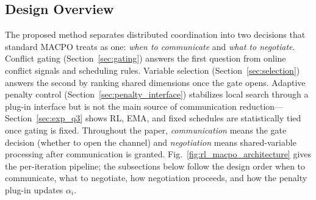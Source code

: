 \documentclass[conference]{IEEEtran}
\begin{document}
\subsection{Design Overview}\label{sec:design_overview}
The proposed method separates distributed coordination into two decisions that standard MACPO treats as one: \emph{when to communicate} and \emph{what to negotiate}. Conflict gating (Section~\ref{sec:gating}) answers the first question from online conflict signals and scheduling rules. Variable selection (Section~\ref{sec:selection}) answers the second by ranking shared dimensions once the gate opens. Adaptive penalty control (Section~\ref{sec:penalty_interface}) stabilizes local search through a plug-in interface but is not the main source of communication reduction---Section~\ref{sec:exp_q3} shows RL, EMA, and fixed schedules are statistically tied once gating is fixed. Throughout the paper, \emph{communication} means the gate decision (whether to open the channel) and \emph{negotiation} means shared-variable processing after communication is granted. Fig.~\ref{fig:rl_macpo_architecture} gives the per-iteration pipeline; the subsections below follow the design order when to communicate, what to negotiate, how negotiation proceeds, and how the penalty plug-in updates $\alpha_i$.
\end{document}
